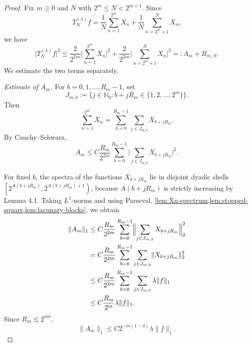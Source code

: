 \documentclass[11pt]{amsart}
\numberwithin{equation}{section}
\theoremstyle{remark}
\begin{document}
\begin{proof}
Fix $m\ge0$ and $N$ with $2^m\le N<2^{m+1}$. Since 
\begin{equation*}
T_N^{(\lambda)}f=\frac1N\sum_{n=1}^{2^m}X_n+\frac1N\sum_{n=2^m+1}^{N}X_n, 
\end{equation*}
we have 
\begin{equation}
\lvert T_N^{(\lambda)}f\rvert^2 \le \frac{2}{2^{2m}}\lvert
\sum_{n=1}^{2^m}X_n\rvert^2 +\frac{2}{2^{2m}}\lvert
\sum_{n=2^m+1}^{N}X_n\rvert^2 =:A_m+B_{m,N}.  \label{eq:AB-splitting}
\end{equation}
We estimate the two terms separately.

\smallskip \noindent\emph{Estimate of $A_m$.} For $b=0,1,\dots,R_m-1$, set 
\begin{equation*}
J_{m,b}:=\bigl\{j\in\mathbb{N}_0:b+jR_m\in\{1,2,\dots,2^m\}\bigr\}. 
\end{equation*}
Then 
\begin{equation*}
\sum_{n=1}^{2^m}X_n =\sum_{b=0}^{R_m-1}\sum_{j\in J_{m,b}} X_{b+jR_m}. 
\end{equation*}
By Cauchy--Schwarz, 
\begin{equation*}
A_m\le C\frac{R_m}{2^{2m}}\sum_{b=0}^{R_m-1}\lvert \sum_{j\in
J_{m,b}}X_{b+jR_m}\rvert^2. 
\end{equation*}


 For fixed $b$, the spectra of the functions $X_{b+j R_m}$ lie in disjoint dyadic shells $\left[2^{A\left(b+j R_m\right)}, 2^{A\left(b+j R_m\right)+1}\right)$, because $A\left(b+j R_m\right)$ is strictly increasing by Lemma 4.1. Taking $L^1$-norms and using Parseval, %
\cref{lem:Xn-spectrum,lem:stopped-square,lem:lacunary-blocks}, we obtain 
\begin{align*}
\lVert A_m\rVert_1 &\le C\frac{R_m}{2^{2m}}\sum_{b=0}^{R_m-1} \Bigl\|%
\sum_{j\in J_{m,b}}X_{b+jR_m}\Bigr\|_2^2 \\
&= C\frac{R_m}{2^{2m}}\sum_{b=0}^{R_m-1}\sum_{j\in J_{m,b}}\lVert
X_{b+jR_m}\rVert_2^2 \\
&\le C\frac{R_m}{2^{2m}}\sum_{b=0}^{R_m-1}\sum_{j\in J_{m,b}}\lambda\lVert
f\rVert_1 \\
&\le C\frac{R_m}{2^m}\lambda\lVert f\rVert_1.
\end{align*}
Since $R_m\lesssim 2^{m\delta}$, 
\begin{equation}
\lVert A_m\rVert_1\le C2^{-m(1-\delta)}\lambda\lVert f\rVert_1.
\label{eq:Am-est}
\end{equation}


\end{proof}
\end{document}
